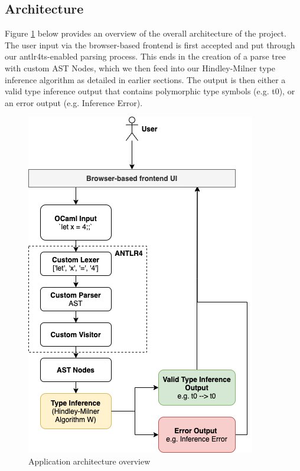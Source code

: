 \subsection{Architecture}
Figure \ref{fig:architecture} below provides an overview of the overall architecture of the project. The user input via the browser-based frontend is first accepted and put through our antlr4ts-enabled parsing process. This ends in the creation of a parse tree with custom AST Nodes, which we then feed into our Hindley-Milner type inference algorithm as detailed in earlier sections. The output is then either a valid type inference output that contains polymorphic type symbols (e.g. t0), or an error output (e.g. Inference Error).
\begin{figure}[H]
\centerline{\includegraphics[width=0.6\linewidth]{images/architecture.png}}
\caption{Application architecture overview}
\label{fig:architecture}
\end{figure}
